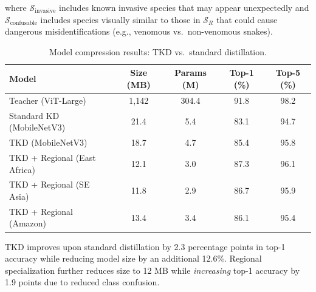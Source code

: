 \noindent where $\mathcal{S}_{\text{invasive}}$ includes known invasive species that may appear unexpectedly and $\mathcal{S}_{\text{confusable}}$ includes species visually similar to those in $\mathcal{S}_R$ that could cause dangerous misidentifications (e.g., venomous vs.\ non-venomous snakes).

\begin{table}[H]
\centering
\caption{Model compression results: TKD vs.\ standard distillation.}
\label{tab:compression}
\begin{tabular}{@{}lcccc@{}}
\toprule
\textbf{Model} & \textbf{Size (MB)} & \textbf{Params (M)} & \textbf{Top-1 (\%)} & \textbf{Top-5 (\%)} \\
\midrule
Teacher (ViT-Large) & 1,142 & 304.4 & 91.8 & 98.2 \\
Standard KD (MobileNetV3) & 21.4 & 5.4 & 83.1 & 94.7 \\
TKD (MobileNetV3) & 18.7 & 4.7 & 85.4 & 95.8 \\
TKD + Regional (East Africa) & 12.1 & 3.0 & 87.3 & 96.1 \\
TKD + Regional (SE Asia) & 11.8 & 2.9 & 86.7 & 95.9 \\
TKD + Regional (Amazon) & 13.4 & 3.4 & 86.1 & 95.4 \\
\bottomrule
\end{tabular}
\end{table}

TKD improves upon standard distillation by 2.3 percentage points in top-1 accuracy while reducing model size by an additional 12.6\%.
Regional specialization further reduces size to 12 MB while \emph{increasing} top-1 accuracy by 1.9 points due to reduced class confusion.

